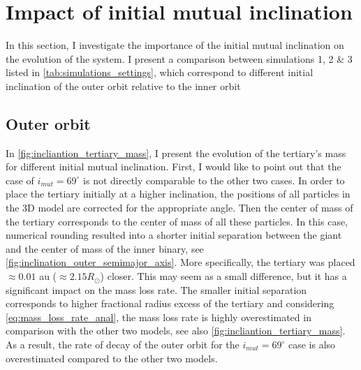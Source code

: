 \section{Impact of initial mutual inclination}\label{sec:inclination}


In this section, I investigate the importance of the initial mutual inclination on the evolution of the system. I present a comparison between simulations  1, 2 \& 3 listed in \cref{tab:simulations_settings}, which correspond to different initial inclination of the outer orbit relative to the inner orbit


\subsection{Outer orbit}

In \cref{fig:incliantion_tertiary_mass}, I present the evolution of the tertiary's mass for different initial mutual inclination. First, I would like to point out that the case of $i_{mut} = 69^{\circ}$ is not directly comparable to the other two cases. In order to place the tertiary initially at a higher inclination, the positions of all particles in the 3D model are corrected for the appropriate angle. Then the center of mass of the tertiary corresponds to the center of mass of all these particles. In this case, numerical rounding resulted into a shorter initial separation between the giant and the center of mass of the inner binary, see \cref{fig:inclination_outer_semimajor_axis}. More specifically, the tertiary was placed $\approx 0.01$ au ($\approx 2.15 R_{\odot}$) closer. This may seem as a small difference, but it has a significant impact on the mass loss rate. The smaller initial separation corresponds to higher fractional radius excess of the tertiary and considering \cref{eq:mass_loss_rate_anal}, the mass loss rate is highly overestimated in comparison with the other two models, see also \cref{fig:incliantion_tertiary_mass}.  As a result, the rate of decay of the outer orbit for the $i_{mut} = 69^{\circ}$ case is also overestimated compared to the other two models.
